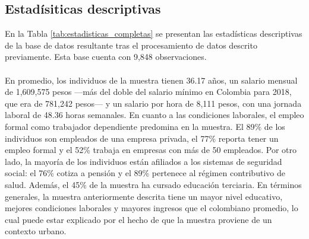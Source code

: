 \documentclass[article,11 pt]{article}
\begin{document}
\subsection{Estadísiticas descriptivas}

En la Tabla \ref{tab:estadisticas_completas} se presentan las estadísticas descriptivas de la base de datos resultante tras el procesamiento de datos descrito previamente. Esta base cuenta con 9,848 observaciones.
\\
\\
En promedio, los individuos de la muestra tienen 36.17 años, un salario mensual de 1,609,575 pesos —más del doble del salario mínimo en Colombia para 2018, que era de 781,242 pesos— y un salario por hora de 8,111 pesos, con una jornada laboral de 48.36 horas semanales. En cuanto a las condiciones laborales, el empleo formal como trabajador dependiente predomina en la muestra. El 89\% de los individuos son empleados de una empresa privada, el 77\% reporta tener un empleo formal y el 52\% trabaja en empresas con más de 50 empleados. Por otro lado, la mayoría de los individuos están afiliados a los sistemas de seguridad social: el 76\% cotiza a pensión y el 89\% pertenece al régimen contributivo de salud. Además, el 45\% de la muestra ha cursado educación terciaria. En términos generales, la muestra anteriormente descrita tiene un mayor nivel educativo, mejores condiciones laborales y mayores ingresos que el colombiano promedio, lo cual puede estar explicado por el hecho de que la muestra proviene de un contexto urbano. 
\end{document}
